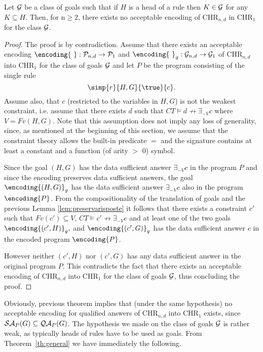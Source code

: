 \begin{theorem}\label{th:general}
Let ${\cal G}$ be a class of goals such that if  $H$  is a head of a rule then $K \in {\cal G}$ for any $K\subseteq H$. Then, for n$\geq 2$, there exists no acceptable encoding of
CHR$_{n,d}$ in CHR$_1$ for the class ${\cal G}$.
\end{theorem}
\begin{proof}
The proof is by contradiction. Assume that there exists an acceptable encoding
$\encoding{\ } :{\cal P}_{n,d} \rightarrow {\cal P}_{1}$ and $\encoding{\ }_g:{\cal G}_{n,d} \rightarrow {\cal G}_{1}$
 of CHR$_{n,d}$ into CHR$_1$ for the class of goals ${\cal G}$ and let $P$ be the program consisting of the single rule
 $$ \simp{r}{H, G}{\true}{c}.$$
Assume also, that $c$ (restricted to the variables in $H,G$) is not the weakest constraint, i.e. assume that there exists  $d$  such that $CT \models d \not \rightarrow \exists _{-V} c$ where $V = Fv(H,G)$. Note that this assumption does not imply any loss of generality, since, as mentioned at the beginning of this section, we assume that the constraint theory allows the built-in predicate $=$ and the signature contains at least a constant and a function (of arity $>$ 0) symbol.

Since  the goal   $(H, G)$ has the data sufficient answer  $\exists _{-V} c$ in the program $P$ and since the encoding preserves data sufficient answers,  the goal $\encoding{ (H, G)}_g$ has the data sufficient answer  $\exists _{-V} c$ also in the program $\encoding{P}$.  From the compositionality of the translation of goals and the previous Lemma \ref{lem:preservarisposte} it follows that there exists a constraint $c'$ such that $Fv(c') \subseteq V$,
$CT \models c'\not \rightarrow \exists _{-V} c$ and
at least one of the two goals $\encoding{(c',H)}_g,$
 and $\encoding{ (c', G) }_g$ has the data sufficient answer $c$ in the encoded program $\encoding{P}$.

However neither  $(c', H)$
 nor $(c', G)$ has any  data sufficient answer in the original program $P$. This contradicts the fact that
 there exists an acceptable encoding
 of CHR$_{n,d}$ into CHR$_1$ for the class of goals ${\cal G}$, thus concluding the proof.
\end{proof}





Obviously, previous theorem implies that (under the same hypothesis) no acceptable encod\-ing for qualified answers of CHR$_{n,d}$ into CHR$_1$ exists,
since  ${\cal SA}_{P}(G) \subseteq  {\cal QA}_{P}(G)$. The hypothesis we made on the class of goals ${\cal G}$ is rather weak, as typically heads of rules have to be used as goals.
From  Theorem~\ref{th:general} we have immediately the
following.

